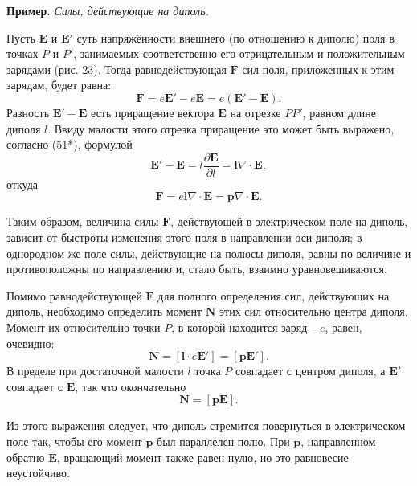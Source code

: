 \documentclass[a4paper,12pt]{article}
\begin{document}

\medskip
\noindent\textbf{Пример.} \textit{Силы, действующие на диполь.}

Пусть $\mathbf{E}$ и $\mathbf{E}'$ суть напряжённости внешнего (по
отношению к диполю) поля в точках $P$ и $P'$, занимаемых соответственно
его отрицательным и положительным зарядами (рис. 23). Тогда
равнодействующая $\mathbf{F}$ сил поля, приложенных к этим зарядам,
будет равна:
$$
    \mathbf{F} = e\mathbf{E}' - e\mathbf{E} = e(\mathbf{E}' - \mathbf{E}).
$$
Разность $\mathbf{E}' - \mathbf{E}$ есть приращение вектора $\mathbf{E}$
на отрезке $PP'$, равном длине диполя $l$. Ввиду малости этого отрезка
приращение это может быть выражено, согласно (51*), формулой
$$
    \mathbf{E}' - \mathbf{E} = l\frac{\partial\mathbf{E}}{\partial l}
    = \mathbf{l}\nabla\cdot\mathbf{E},
$$
откуда
\begin{equation}
    \mathbf{F} = e\mathbf{l}\nabla\cdot\mathbf{E}
              = \mathbf{p}\nabla\cdot\mathbf{E}.
    \tag{17.5}
\end{equation}

Таким образом, величина силы $\mathbf{F}$, действующей в электрическом
поле на диполь, зависит от быстроты изменения этого поля в направлении
оси диполя; в однородном же поле силы, действующие на полюсы диполя,
равны по величине и противоположны по направлению и, стало быть, взаимно
уравновешиваются.

Помимо равнодействующей $\mathbf{F}$ для полного определения сил,
действующих на диполь, необходимо определить момент $\mathbf{N}$ этих
сил относительно центра диполя. Момент их относительно точки $P$,
в которой находится заряд $-e$, равен, очевидно:
$$
    \mathbf{N} = [\mathbf{l}\cdot e\mathbf{E}'] = [\mathbf{p}\mathbf{E}'].
$$
В пределе при достаточной малости $l$ точка $P$ совпадает с центром
диполя, а $\mathbf{E}'$ совпадает с $\mathbf{E}$, так что окончательно
\begin{equation}
    \mathbf{N} = [\mathbf{p}\mathbf{E}].
    \tag{17.6}
\end{equation}

Из этого выражения следует, что диполь стремится повернуться в
электрическом поле так, чтобы его момент $\mathbf{p}$ был параллелен
полю. При $\mathbf{p}$, направленном обратно $\mathbf{E}$, вращающий
момент также равен нулю, но это равновесие неустойчиво.

\end{document}
